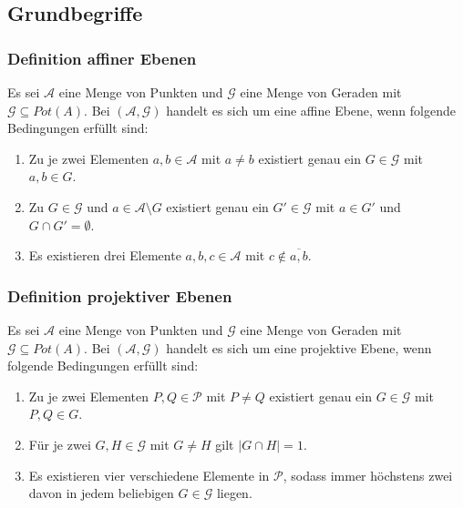 \documentclass{beamer}
\theoremstyle{plain}
\theoremstyle{definition}
\theoremstyle{rem}
\begin{document}
\subsection{Grundbegriffe}
\begin{frame}
    \frametitle{Definition affiner Ebenen}
    \begin{definition}
        Es sei $\mathcal{A}$ eine Menge von Punkten und $\mathcal{G}$ eine Menge von Geraden mit $\mathcal{G} \subseteq Pot(A)$.
        Bei $(\mathcal{A},\mathcal{G})$ handelt es sich um eine affine Ebene, wenn folgende Bedingungen erfüllt sind:
        \begin{enumerate}
            \item Zu je zwei Elementen $a, b\in \mathcal{A}$ mit $a\ne b$ existiert genau ein $G\in\mathcal{G}$ mit $a, b \in G$. \\
            \item Zu $G\in\mathcal{G}$ und $a\in\mathcal{A}\setminus G$ existiert genau ein $G'\in\mathcal{G}$ mit $a\in G'$ und $G\cap G'=\emptyset$. \\
            \item Es existieren drei Elemente $a,b,c\in\mathcal{A}$ mit $c\notin\overline{a,b}$. \\
        \end{enumerate}
    \end{definition}
\end{frame}
\begin{frame}
    \frametitle{Definition projektiver Ebenen}
    \begin{definition}
        Es sei $\mathcal{A}$ eine Menge von Punkten und $\mathcal{G}$ eine Menge von Geraden mit $\mathcal{G} \subseteq Pot(A)$.
        Bei $(\mathcal{A},\mathcal{G})$ handelt es sich um eine projektive Ebene, wenn folgende Bedingungen erfüllt sind:
	\begin{enumerate}
		\item Zu je zwei Elementen $P, Q\in \mathcal{P}$ mit $P\ne Q$ existiert genau ein $G\in\mathcal{G}$ mit $P, Q \in G$. \\
		\item Für je zwei $G,H\in\mathcal{G}$ mit $G\ne H$ gilt $|G\cap H|=1$.
		\item Es existieren vier verschiedene Elemente in $\mathcal{P}$, sodass immer höchstens zwei davon in jedem beliebigen $G\in\mathcal{G}$ liegen.
	\end{enumerate}
    \end{definition}
\end{frame}
\end{document}
